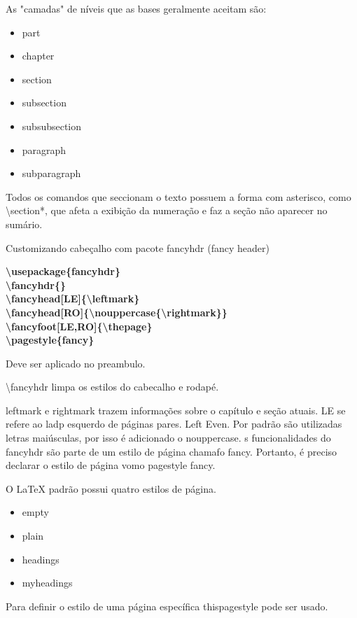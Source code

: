 \documentclass[a4paper, 12pts]{book}
\begin{document}
As "camadas" de níveis que as bases geralmente aceitam são:
\begin{itemize}
    \item part
    \item chapter
    \item section
    \item subsection
    \item subsubsection
    \item paragraph
    \item subparagraph
\end{itemize}

Todos os comandos que seccionam o texto possuem a forma
com asterisco, como \textbackslash section*, que afeta a exibição
da numeração e faz a seção não aparecer no sumário.

Customizando cabeçalho com pacote fancyhdr (fancy header)

\textbf{
    \textbackslash usepackage\{fancyhdr\}\\
    \textbackslash fancyhdr\{\} \\
    \textbackslash fancyhead[LE]\{\textbackslash leftmark\} \\
    \textbackslash fancyhead[RO]\{\textbackslash nouppercase\{\textbackslash rightmark\}\} \\
    \textbackslash fancyfoot[LE,RO]\{\textbackslash thepage\} \\
    \textbackslash pagestyle\{fancy\} 
}

Deve ser aplicado no preambulo.

\textbackslash fancyhdr limpa os estilos do cabecalho e rodapé.

leftmark e rightmark trazem informações sobre o capítulo e seção atuais.
LE se refere ao ladp esquerdo de páginas pares. Left Even.
Por padrão são utilizadas letras maiúsculas, por isso
é adicionado o nouppercase.
s funcionalidades do fancyhdr são parte de um estilo de página chamafo fancy.
Portanto, é preciso declarar o estilo de página vomo pagestyle fancy.

O LaTeX padrão possui quatro estilos de página.
\begin{itemize}
    \item empty
    \item plain
    \item headings
    \item myheadings
\end{itemize}

Para definir o estilo de uma página específica thispagestyle pode ser usado.
\end{document}
